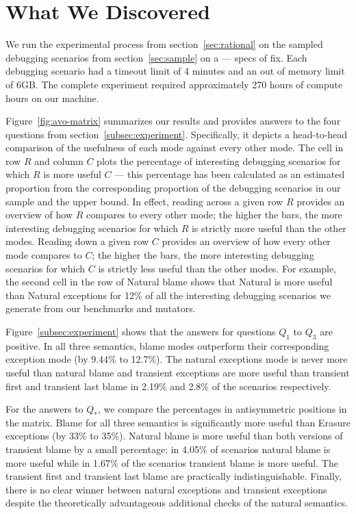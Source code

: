 \section{What We Discovered}



We run the experimental process from section~\ref{sec:rational} on the
sampled debugging scenarios from section~\ref{sec:sample} on a --- specs
of fix. Each debugging scenario had a timeout limit of 4 minutes and an
out of memory limit of 6GB. The complete experiment required
approximately 270 hours of compute hours on our machine. 


Figure~\ref{fig:avo-matrix} summarizes our results and provides answers to
the four questions from section~\ref{subsec:experiment}.  Specifically, it
depicts a head-to-head comparison of the usefulness of each mode against
every other mode.  The cell in row $R$ and column $C$ plots the percentage
of interesting debugging scenarios for which $R$ is more useful $C$ ---
this percentage has been calculated as an estimated proportion from the
corresponding proportion of the debugging scenarios in our sample and the
upper bound.  In effect, reading across a given row $R$ provides an
overview of how $R$ compares to every other mode; the higher the bars, the
more interesting debugging scenarios for which $R$ is strictly more useful
than the other modes.  Reading down a given row $C$ provides an overview
of how every other mode compares to $C$; the higher the bars, the more
interesting debugging scenarios for which $C$ is strictly less useful than
the other modes. For example, the second cell in the row of Natural blame
shows that Natural is more useful than Natural exceptions for 12\% of all
the interesting debugging scenarios we generate from our benchmarks and
mutators. 

Figure~\ref{subsec:experiment} shows that the answers for questions $Q_1$
to $Q_3$ are positive. In all three semantics, blame modes outperform
their corresponding exception mode (by 9.44\% to 12.7\%). The natural
exceptions mode is never more useful than natural blame and  transient
exceptions are more useful than transient first and transient last blame
in 2.19\% and 2.8\% of the scenarios respectively. 


For the answers to $Q_*$, we compare the percentages in antisymmetric
positions in the matrix. Blame for all three semantics is significantly
more useful than Erasure exceptions (by 33\% to 35\%). Natural blame is
more useful than both versions of transient blame by a small percentage;
in 4.05\% of scenarios natural blame is more useful while in 1.67\% of the
scenarios transient blame is more useful. The transient first and
transient last blame are practically indistinguishable. Finally, there is
no clear winner between natural exceptions and transient exceptions
despite the theoretically advantageous additional checks of the natural
semantics.


